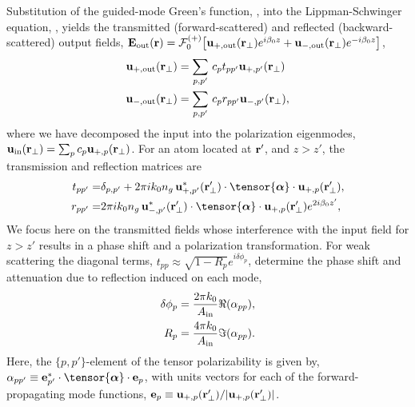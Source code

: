 \documentclass[preprint,aps,pra,onecolumn]{revtex4-1} %
\newcommand{\out}{{\rm out}}
\newcommand{\fwd}{+}
\newcommand{\bwd}{-}
\newcommand{\trans}{+}
\newcommand{\refl}{-}
\newcommand{\Eamp}{\mathcal{F}_0^{(+)}}
\begin{document}
Substitution of the guided-mode Green's function, , into the Lippman-Schwinger equation, , yields the transmitted (forward-scattered) and reflected (backward-scattered) output fields, $\mathbf{E}_{\out}(\br) = \Eamp \big[ \mathbf{u}_{\trans, \out} (\br_\perp) e^{i \beta_0 z} + \mathbf{u}_{\refl,\out} (\br_\perp) e^{-i \beta_0 z} \big]$, 
	\begin{align}
		\mathbf{u}_{\trans, \out} (\br_\perp) &=  \sum_{p,p'}  \, c_{p} t_{pp'} \mathbf{u}_{\fwd, p'}(\br_\perp) \\ 
		\mathbf{u}_{\refl,\out} (\br_\perp) &=  \sum_{p,p'}  \, c_{p} r_{pp'} \mathbf{u}_{\bwd, p'}(\br_\perp),
	\end{align}
where we have decomposed the input into the polarization eigenmodes, $\mbf{u}_{\rm in}(\mbf{r}_\perp) = \sum_{p} c_{p} \mathbf{u}_{\fwd,p}(\br_\perp)$.  For an atom located at $\mathbf{r}'$, and $z>z'$, the transmission and reflection matrices are 
	\begin{align} \label{Eq::PolarizationTransformation}
		t_{pp'} =& \delta_{p,p'} +  2\pi i k_0 n_g \, \mathbf{u}^*_{+, p'}(\br'_\perp) \cdot 
\tensor{\boldsymbol{\alpha}} \cdot \mathbf{u}_{+, p}(\br'_\perp) , \\
		r_{pp'} =&  2\pi i k_0 n_g \, \mathbf{u}^*_{\bwd, p'}(\br'_\perp) \cdot 
\tensor{\boldsymbol{\alpha}} \cdot \mathbf{u}_{\fwd, p}(\br'_\perp) e^{2 i\beta_0 z'} , 
	\end{align} 
We focus here on the transmitted fields whose interference with the input field for $z>z'$ results in a phase shift and a polarization transformation.  For weak scattering the diagonal terms, $t_{p p} \approx \sqrt{1-R_p}e^{i \delta \phi_p}$, determine the phase shift and attenuation due to reflection induced on each mode,
	\begin{align}
		 \delta \phi_p &= \frac{2 \pi k_0}{A_{\rm in}} \Re(\alpha_{pp}),  \label{Eq::PhaseShift} \\
		R_p &=  \frac{4 \pi k_0}{A_{\rm in}} \Im(\alpha_{pp}) .\label{Eq::Attenuation} 
	\end{align} 
Here, the $\{p,p'\}$-element of the tensor polarizability is given by, $\alpha_{pp'} \equiv \mathbf{e}^*_{p'} \cdot \tensor{\boldsymbol{\alpha}}\cdot \mathbf{e}_{p}$, with units vectors for each of the forward-propagating mode functions, $\mathbf{e}_{p}\equiv \mathbf{u}_{+,p}(\mathbf{r}'_\perp)/|\mathbf{u}_{+,p}(\mathbf{r}'_\perp)|$. 
\end{document}
